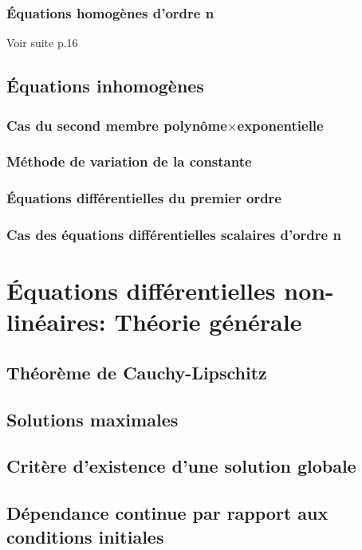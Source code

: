 \documentclass[]{report}
\begin{document}
\subsection{Équations homogènes d'ordre n}

Voir suite p.16

\section{Équations inhomogènes}

\subsection{Cas du second membre polynôme$\times$exponentielle}

\subsection{Méthode de variation de la constante}

\subsection*{Équations différentielles du premier ordre}

\subsection*{Cas des équations différentielles scalaires d'ordre n}

\chapter{Équations différentielles non-linéaires: Théorie générale}

\section{Théorème de Cauchy-Lipschitz}

\section{Solutions maximales}

\section{Critère d'existence d'une solution globale}

\section{Dépendance continue par rapport aux conditions initiales}
\end{document}
